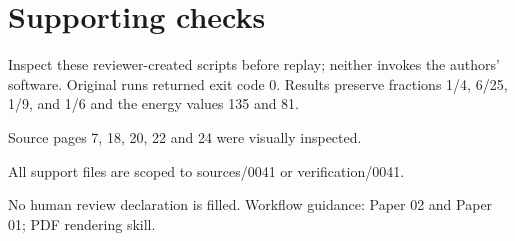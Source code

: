 \documentclass[10pt]{article}
\begin{document}
\section*{Supporting checks}
Inspect these reviewer-created scripts before replay; neither invokes the authors’ software. Original runs returned exit code 0. Results preserve fractions 1/4, 6/25, 1/9, and 1/6 and the energy values 135 and 81.\par
Source pages 7, 18, 20, 22 and 24 were visually inspected.\par
All support files are scoped to sources/0041 or verification/0041.\par
No human review declaration is filled. Workflow guidance: Paper 02 and Paper 01; PDF rendering skill.\par
\end{document}
